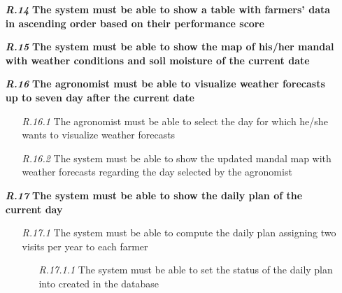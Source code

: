 \begin{itemize}
\item [\textbf{\textit{R.14}}] \textbf{The system must be able to show a table with farmers' data in ascending order based on their performance score}
\item [\textbf{\textit{R.15}}] \textbf{The system must be able to show the map of his/her mandal with weather conditions and soil moisture of the current date}
\item [\textbf{\textit{R.16}}] \textbf{The agronomist must be able to visualize weather forecasts up to seven day after the current date}
        \begin{itemize}
            \item [\textit{R.16.1}] The agronomist must be able to select the day for which he/she wants to visualize weather forecasts
	        \item [\textit{R.16.2}] The system must be able to show the updated mandal map with weather forecasts regarding the day selected by the agronomist
        \end{itemize}
        \item [\textbf{\textit{R.17}}] \textbf{The system must be able to show the daily plan of the current day}
        \begin{itemize}
            \item [\textit{R.17.1}] The system must be able to compute the daily plan assigning two visits per year to each farmer
            \begin{itemize}
                \item [\textit{R.17.1.1}] The system must be able to set the status of the daily plan into created in the database
            \end{itemize}
        \end{itemize}
		


\end{itemize}

